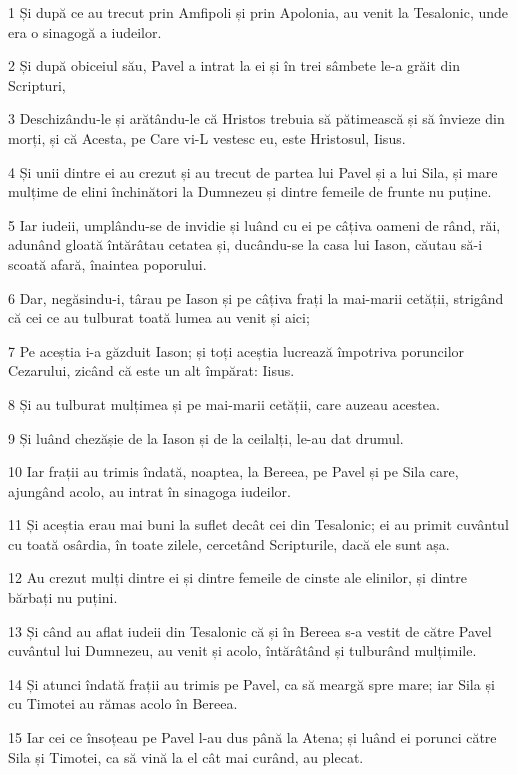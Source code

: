 \par 1 Și după ce au trecut prin Amfipoli și prin Apolonia, au venit la Tesalonic, unde era o sinagogă a iudeilor.
\par 2 Și după obiceiul său, Pavel a intrat la ei și în trei sâmbete le-a grăit din Scripturi,
\par 3 Deschizându-le și arătându-le că Hristos trebuia să pătimească și să învieze din morți, și că Acesta, pe Care vi-L vestesc eu, este Hristosul, Iisus.
\par 4 Și unii dintre ei au crezut și au trecut de partea lui Pavel și a lui Sila, și mare mulțime de elini închinători la Dumnezeu și dintre femeile de frunte nu puține.
\par 5 Iar iudeii, umplându-se de invidie și luând cu ei pe câțiva oameni de rând, răi, adunând gloată întărâtau cetatea și, ducându-se la casa lui Iason, căutau să-i scoată afară, înaintea poporului.
\par 6 Dar, negăsindu-i, târau pe Iason și pe câțiva frați la mai-marii cetății, strigând că cei ce au tulburat toată lumea au venit și aici;
\par 7 Pe aceștia i-a găzduit Iason; și toți aceștia lucrează împotriva poruncilor Cezarului, zicând că este un alt împărat: Iisus.
\par 8 Și au tulburat mulțimea și pe mai-marii cetății, care auzeau acestea.
\par 9 Și luând chezășie de la Iason și de la ceilalți, le-au dat drumul.
\par 10 Iar frații au trimis îndată, noaptea, la Bereea, pe Pavel și pe Sila care, ajungând acolo, au intrat în sinagoga iudeilor.
\par 11 Și aceștia erau mai buni la suflet decât cei din Tesalonic; ei au primit cuvântul cu toată osârdia, în toate zilele, cercetând Scripturile, dacă ele sunt așa.
\par 12 Au crezut mulți dintre ei și dintre femeile de cinste ale elinilor, și dintre bărbați nu puțini.
\par 13 Și când au aflat iudeii din Tesalonic că și în Bereea s-a vestit de către Pavel cuvântul lui Dumnezeu, au venit și acolo, întărâtând și tulburând mulțimile.
\par 14 Și atunci îndată frații au trimis pe Pavel, ca să meargă spre mare; iar Sila și cu Timotei au rămas acolo în Bereea.
\par 15 Iar cei ce însoțeau pe Pavel l-au dus până la Atena; și luând ei porunci către Sila și Timotei, ca să vină la el cât mai curând, au plecat.
